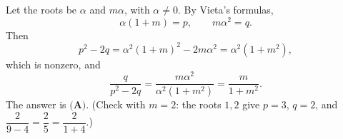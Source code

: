 Let the roots be $\alpha$ and $m\alpha$, with $\alpha\ne0$. By Vieta's formulas,
\[\alpha(1+m)=p,\qquad m\alpha^2=q .\]
Then
\[p^2-2q=\alpha^2(1+m)^2-2m\alpha^2=\alpha^2\left(1+m^2\right),\]
which is nonzero, and
\[\dfrac{q}{p^2-2q}=\dfrac{m\alpha^2}{\alpha^2\left(1+m^2\right)}=\dfrac{m}{1+m^2}.\]
The answer is $\boxed{\textbf{(A)}}$. (Check with $m=2$: the roots $1,2$ give $p=3$, $q=2$, and $\dfrac{2}{9-4}=\dfrac{2}{5}=\dfrac{2}{1+4}$.)
